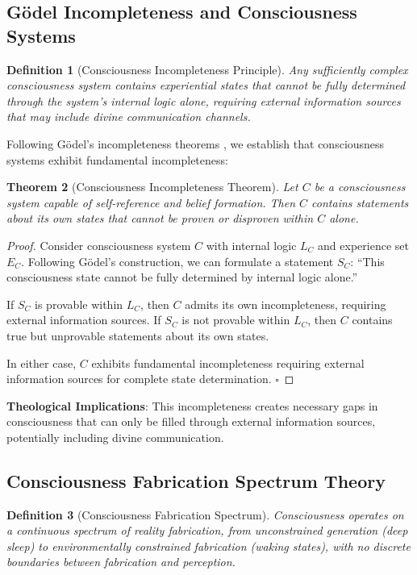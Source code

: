\documentclass[12pt,a4paper]{article}
\newtheorem{theorem}{Theorem}[section]
\newtheorem{definition}[theorem]{Definition}
\begin{document}
\subsection{Gödel Incompleteness and Consciousness Systems}

\begin{definition}[Consciousness Incompleteness Principle]
Any sufficiently complex consciousness system contains experiential states that cannot be fully determined through the system's internal logic alone, requiring external information sources that may include divine communication channels.
\end{definition}

Following Gödel's incompleteness theorems \citep{godel1931formally}, we establish that consciousness systems exhibit fundamental incompleteness:

\begin{theorem}[Consciousness Incompleteness Theorem]
Let $C$ be a consciousness system capable of self-reference and belief formation. Then $C$ contains statements about its own states that cannot be proven or disproven within $C$ alone.
\end{theorem}

\begin{proof}
Consider consciousness system $C$ with internal logic $L_C$ and experience set $E_C$. Following Gödel's construction, we can formulate a statement $S_C$: ``This consciousness state cannot be fully determined by internal logic alone.''

If $S_C$ is provable within $L_C$, then $C$ admits its own incompleteness, requiring external information sources. If $S_C$ is not provable within $L_C$, then $C$ contains true but unprovable statements about its own states.

In either case, $C$ exhibits fundamental incompleteness requiring external information sources for complete state determination. $\square$
\end{proof}

\textbf{Theological Implications}: This incompleteness creates necessary gaps in consciousness that can only be filled through external information sources, potentially including divine communication.

\subsection{Consciousness Fabrication Spectrum Theory}

\begin{definition}[Consciousness Fabrication Spectrum]
Consciousness operates on a continuous spectrum of reality fabrication, from unconstrained generation (deep sleep) to environmentally constrained fabrication (waking states), with no discrete boundaries between fabrication and perception.
\end{definition}
\end{document}
